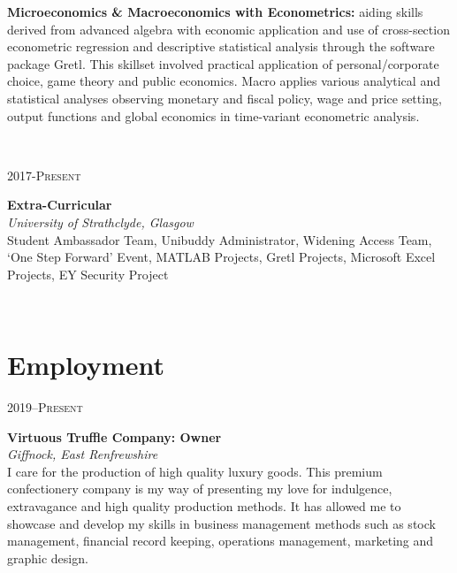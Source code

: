 \documentclass[a4, 10pt]{article}
\begin{document}
{\begin{minipage}[t]{.15\linewidth}
	\hfill 
        \textsc{}
\end{minipage}
\hfill\vline\hfill
\begin{minipage}[t]{.80\linewidth}
	\textbf{Microeconomics \& Macroeconomics with Econometrics:} aiding skills derived from advanced algebra with economic application and use of cross-section econometric regression and descriptive statistical analysis through the software package Gretl. This skillset involved practical application of personal/corporate choice, game theory and public economics. Macro applies various analytical and statistical analyses observing monetary and fiscal policy, wage and price setting, output functions and global economics in time-variant econometric analysis.
\end{minipage}\\
\vspace{0.25cm} 

\begin{minipage}[t]{.15\linewidth}
        \hfill             
        \textsc{2017-Present}
\end{minipage}                    
\hfill\vline\hfill                                                                                
\begin{minipage}[t]{.80\linewidth}
	\textbf{Extra-Curricular}\\            
        \textit{University of Strathclyde, Glasgow}\\
	Student Ambassador Team, Unibuddy Administrator, Widening Access Team, `One Step Forward' Event, MATLAB Projects, Gretl Projects, Microsoft Excel Projects, EY Security Project
\end{minipage}\\
\vspace{0.25cm}


\section{Employment}

\begin{minipage}[t]{.15\linewidth}
        \hfill 
        \textsc{2019--Present}
\end{minipage}
\hfill\vline\hfill
\begin{minipage}[t]{.80\linewidth}
        \textbf{Virtuous Truffle Company: Owner}\\
	\textit{Giffnock, East Renfrewshire}\\ 
	I care for the production of high quality luxury goods. This premium confectionery company is my way of presenting my love for indulgence, extravagance and high quality production methods. It has allowed me to showcase and develop my skills in business management methods such as stock management, financial record keeping, operations management, marketing and graphic design.
\end{minipage}\\
\vspace{0.25cm}

}
\end{document}
